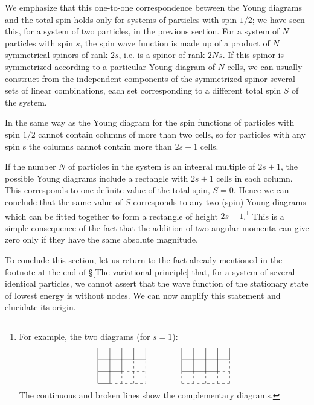 We emphasize that this one-to-one correspondence between the Young diagrams and the total spin holds only for systems of particles with spin $ 1/2 $; we have seen this, for a system of two particles, in the previous section. For a system of $ N $ particles with spin $ s $, the spin wave function is made up of a product of $ N $ symmetrical spinors of rank $ 2s $, i.e. is a spinor of rank $ 2Ns $. If this spinor is symmetrized according to a particular Young diagram of $ N $ cells, we can usually construct from the independent components of the symmetrized spinor several sets of linear combinations, each set corresponding to a different total spin $ S $ of the system.

In the same way as the Young diagram for the spin functions of particles with spin $ 1/2 $ cannot contain columns of more than two cells, so for particles with any spin s the columns cannot contain more than $ 2s + 1 $ cells.

If the number $ N $ of particles in the system is an integral multiple of $ 2s + 1 $, the possible Young diagrams include a rectangle with $ 2s + 1 $ cells in each column. This corresponds to one definite value of the total spin, $ S = 0 $. Hence we can conclude that the same value of $ S $ corresponds to any two (spin) Young diagrams which can be fitted together to form a rectangle of height $ 2s + 1 $.\footnote{For example, the two diagrams (for $ s = 1 $):
\[ \begin{tikzpicture}[scale=0.5]
		\draw (0,3)--(4,3);
		\draw (0,2)--(4,2);
		\draw (0,1)--(2,1);
		\draw[dashed] (2,1)--(4,1);
		\draw (0,0)--(1,0);
		\draw[dashed] (1,0)--(4,0);
		\draw (0,0)--(0,3);
		\draw (1,0)--(1,3);
		\draw (2,1)--(2,3);
		\draw[dashed] (2,0)--(2,1);
		\draw (3,2)--(3,3);
		\draw[dashed] (3,0)--(3,2);
		\draw (4,2)--(4,3);
		\draw[dashed] (4,0)--(4,2);
		\draw (7,3)--(11,3);
		\draw (7,2)--(11,2);
		\draw (7,1)--(10,1);
		\draw[dashed] (10,1)--(11,1);
		\draw[dashed] (7,0)--(11,0);
		\draw[dashed] (7,0)--(7,1);
		\draw (7,1)--(7,3);
		\draw[dashed] (8,0)--(8,1);
		\draw (8,1)--(8,3);
		\draw[dashed] (9,0)--(9,1);
		\draw (9,1)--(9,3);
		\draw[dashed] (10,0)--(10,1);
		\draw (10,1)--(10,3);
		\draw[dashed] (11,0)--(11,2);
		\draw (11,2)--(11,3);
		\end{tikzpicture} \]
The continuous and broken lines show the complementary diagrams.
} This is a simple consequence of the fact that the addition of two angular momenta can give zero only if they have the same absolute magnitude.

To conclude this section, let us return to the fact already mentioned in the footnote at the end of \S\ref{The variational principle} that, for a system of several identical particles, we cannot assert that the wave function of the stationary state of lowest energy is without nodes. We can now amplify this statement and elucidate its origin.

